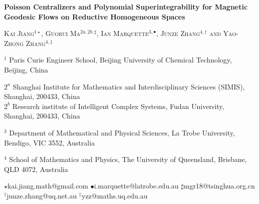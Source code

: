 \documentclass[11pt]{amsart}
\theoremstyle{definition}
\theoremstyle{plain}
\theoremstyle{conclusion}
\begin{document}
 

\thispagestyle{empty}
\begin{center}
	\Large{{\bf  Poisson Centralizers and Polynomial Superintegrability for Magnetic Geodesic Flows on Reductive Homogeneous Spaces }}
\end{center}
 
\vskip 0.3cm
\begin{center}
	\textsc{Kai Jiang$^{1\star}$,  Guorui Ma$^{2a,2b,\sharp}$,    Ian Marquette$^{3,\bullet}$,   Junze Zhang$^{4,\dagger}$  and Yao-Zhong Zhang$^{4,\ddagger}$}
\end{center}
\vskip 0.2cm
\begin{center}
	$^1$   Paris Curie Engineer School, Beijing University of Chemical Technology, Beijing, China
\end{center}
\begin{center}
	$2^a$ Shanghai Institute for Mathematics and Interdisciplinary Sciences (SIMIS), Shanghai, 200433, China  \\
    $2^b$  Research institute of Intelligent Complex Systems, Fudan University, Shanghai, 200433, China 
\end{center}
\begin{center}
	$^3$ Department of Mathematical and Physical Sciences, La Trobe University, Bendigo, VIC 3552, Australia
\end{center}


\begin{center}
	$^4$ School of Mathematics and Physics, The University of Queensland, Brisbane, QLD 4072, Australia
\end{center}

 
\begin{center}
	\footnotesize{ $\star$\textsf{kai.jiang.math@gmail.com} \hskip 0.25cm
    $\bullet$\textsf{i.marquette@latrobe.edu.au} \hskip 0.25cm
    $\sharp$\textsf{mgr18@tsinghua.org.cn} \hskip 0.25cm
 $^\dagger$\textsf{junze.zhang@uq.net.au} \hskip 0.25cm
 $^\ddagger$\textsf{yzz@maths.uq.edu.au}}
\end{center}
\vskip  1cm

 
\end{document}
